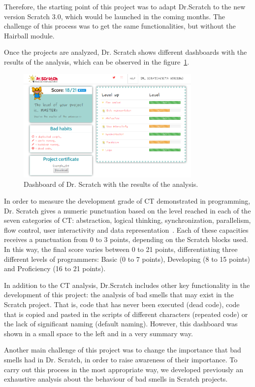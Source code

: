 Therefore, the starting point of this project was to adapt Dr.Scratch to the new version Scratch 3.0, which would be launched in the coming months. The challenge of this process was to get the same functionalities, but without the Hairball module.

\hfill

Once the projects are analyzed, Dr. Scratch shows different dashboards with the results of the analysis, which can be observed in the figure~\ref{fig:dashboards}.

\begin{figure}
  \centering
  \includegraphics[width=9cm, keepaspectratio]{img/dashboards.png}
  \caption{Dashboard of Dr. Scratch with the results of the analysis.}
  \label{fig:dashboards}
\end{figure}

In order to measure the development grade of CT demonstrated in programming, Dr. Scratch gives a numeric punctuation based on the level reached in each of the seven categories of CT: abstraction, logical thinking, synchronization, parallelism, flow control, user interactivity and data representation~\cite{moreno2015dr}. Each of these capacities receives a punctuation from 0 to 3 points, depending on the Scratch blocks used. In this way, the final score varies between 0 to 21 points, differentiating three different levels of programmers: Basic (0 to 7 points), Developing (8 to 15 points) and Proficiency (16 to 21 points).   

In addition to the CT analysis, Dr.Scratch includes other key functionality in the development of this project: the analysis of bad smells that may exist in the Scratch project. That is, code that has never been executed (dead code), code that is copied and pasted in the scripts of different characters (repeated code) or the lack of significant naming (default naming). However, this dashboard was shown in a small space to the left and in a very summary way.

Another main challenge of this project was to change the importance that bad smells had in Dr. Scratch, in order to raise awareness of their importance. To carry out this process in the most appropriate way, we developed previously an exhaustive analysis about the behaviour of bad smells in Scratch projects.


